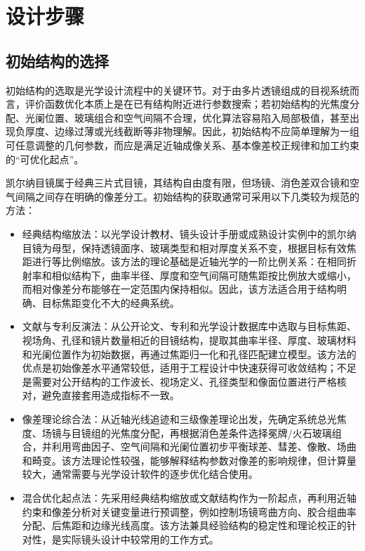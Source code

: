 \section{设计步骤}

\subsection{初始结构的选择}

初始结构的选取是光学设计流程中的关键环节。对于由多片透镜组成的目视系统而言，评价函数优化本质上是在已有结构附近进行参数搜索；若初始结构的光焦度分配、光阑位置、玻璃组合和空气间隔不合理，优化算法容易陷入局部极值，甚至出现负厚度、边缘过薄或光线截断等非物理解。因此，初始结构不应简单理解为一组可任意调整的几何参数，而应是满足近轴成像关系、基本像差校正规律和加工约束的“可优化起点”\cite{Kingslake2010,Fischer2008,Laikin2007}。

凯尔纳目镜属于经典三片式目镜，其结构自由度有限，但场镜、消色差双合镜和空气间隔之间存在明确的像差分工。初始结构的获取通常可采用以下几类较为规范的方法：

\begin{itemize}
\item
  经典结构缩放法：以光学设计教材、镜头设计手册或成熟设计实例中的凯尔纳目镜为母型，保持透镜面序、玻璃类型和相对厚度关系不变，根据目标有效焦距进行等比例缩放。该方法的理论基础是近轴光学的一阶比例关系：在相同折射率和相似结构下，曲率半径、厚度和空气间隔可随焦距按比例放大或缩小，而相对像差分布能够在一定范围内保持相似。因此，该方法适合用于结构明确、目标焦距变化不大的经典系统。
\item
  文献与专利反演法：从公开论文、专利和光学设计数据库中选取与目标焦距、视场角、孔径和镜片数量相近的目镜结构，提取其曲率半径、厚度、玻璃材料和光阑位置作为初始数据，再通过焦距归一化和孔径匹配建立模型。该方法的优点是初始像差水平通常较低，适用于工程设计中快速获得可收敛结构；不足是需要对公开结构的工作波长、视场定义、孔径类型和像面位置进行严格核对，避免直接套用造成指标不一致。
\item
  像差理论综合法：从近轴光线追迹和三级像差理论出发，先确定系统总光焦度、场镜与目镜组的光焦度分配，再根据消色差条件选择冕牌/火石玻璃组合，并利用弯曲因子、空气间隔和光阑位置初步平衡球差、彗差、像散、场曲和畸变。该方法理论性较强，能够解释结构参数对像差的影响规律，但计算量较大，通常需要与光学设计软件的逐步优化结合使用。
\item
  混合优化起点法：先采用经典结构缩放或文献结构作为一阶起点，再利用近轴约束和像差分析对关键变量进行预调整，例如控制场镜弯曲方向、胶合组曲率分配、后焦距和边缘光线高度。该方法兼具经验结构的稳定性和理论校正的针对性，是实际镜头设计中较常用的工作方式。
\end{itemize}


